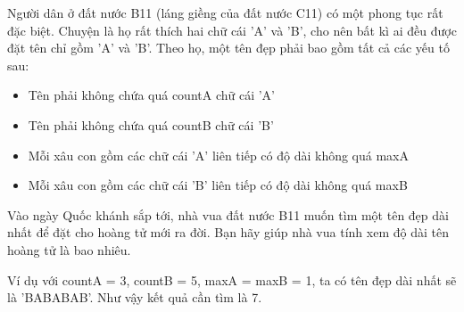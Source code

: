 Người dân ở đất nước B11 (láng giềng của đất nước C11) có một phong tục rất đặc biệt. Chuyện là họ rất thích hai chữ cái 'A' và 'B', cho nên bất kì ai đều được đặt tên chỉ gồm 'A' và 'B'. Theo họ, một tên đẹp phải bao gồm tất cả các yếu tố sau:  
\begin{itemize}
	\item     Tên phải không chứa quá countA chữ cái 'A'   
	\item     Tên phải không chứa quá countB chữ cái 'B'   
	\item     Mỗi xâu con gồm các chữ cái 'A' liên tiếp có độ dài không quá maxA   
	\item     Mỗi xâu con gồm các chữ cái 'B' liên tiếp có độ dài không quá maxB   
\end{itemize}

   Vào ngày Quốc khánh sắp tới, nhà vua đất nước B11 muốn tìm một tên đẹp dài nhất để đặt cho hoàng tử mới ra đời. Bạn hãy giúp nhà vua tính xem độ dài tên hoàng tử là bao nhiêu.  

   Ví dụ với countA = 3, countB = 5, maxA = maxB = 1, ta có tên đẹp dài nhất sẽ là 'BABABAB'. Như vậy kết quả cần tìm là 7.